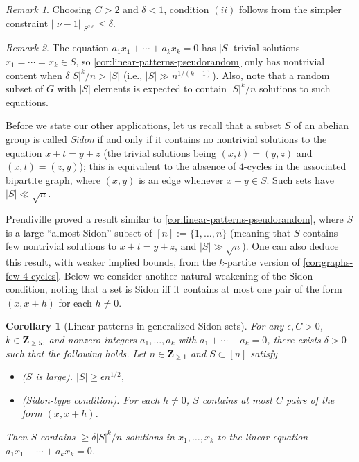 \documentclass[reqno,11pt]{amsart}
\newtheorem{corollary}[theorem]{Corollary}
\theoremstyle{definition}
\theoremstyle{remark}
\newtheorem*{remark}{Remark}
\numberwithin{equation}{section}
\newcommand{\Z}{\mathbf{Z}}
\begin{document}
\begin{remark}
Choosing $C > 2$ and $\delta < 1$, condition $(ii)$ follows from the simpler constraint $||\nu - 1||_{S^{2\ell}} \le \delta$.
\end{remark}

\begin{remark}
The equation $a_1 x_1 + \cdots + a_k x_k = 0$ has $|S|$ trivial solutions $x_1 = \cdots = x_k \in S$, so \cref{cor:linear-patterns-pseudorandom} only has nontrivial content when $\delta |S|^k / n > |S|$ (i.e., $|S| \gg n^{1/(k-1)}$). Also, note that a random subset of $G$ with $|S|$ elements is expected to contain $|S|^k/n$ solutions to such equations.
\end{remark}

Before we state our other applications, let us recall that a subset $S$ of an abelian group is called \emph{Sidon} if and only if it contains no nontrivial solutions to the equation $x + t = y + z$ (the trivial solutions being $(x, t) = (y, z)$ and $(x, t) = (z, y)$); this is equivalent to the absence of $4$-cycles in the associated bipartite graph, where $(x, y)$ is an edge whenever $x + y \in S$. Such sets have $|S| \ll \sqrt{n}$.

Prendiville \cite{prendiville2022solving} proved a result similar to \cref{cor:linear-patterns-pseudorandom}, where $S$ is a large ``almost-Sidon'' subset of $[n] := \{1, \ldots, n\}$ (meaning that $S$ contains few nontrivial solutions to $x + t = y + z$, and $|S| \gg \sqrt{n}$). One can also deduce this result, with weaker implied bounds, from the $k$-partite version of \cref{cor:graphs-few-4-cycles}. Below we consider another natural weakening of the Sidon condition, noting that a set is Sidon iff it contains at most one pair of the form $(x, x+h)$ for each $h \neq 0$.

\begin{corollary}[Linear patterns in generalized Sidon sets] \label{cor:linear-patterns-generalized-Sidon}
For any $\epsilon, C > 0$, $k \in \Z_{\ge 5}$, and nonzero integers $a_1, \ldots, a_k$ with $a_1 + \cdots + a_k = 0$, there exists $\delta > 0$ such that the following holds. Let $n \in \Z_{\ge 1}$ and $S \subset [n]$ satisfy
\begin{itemize}
    \item[$(i)$] \emph{($S$ is large).} $|S| \ge \epsilon n^{1/2}$,
    \item[$(ii)$] \emph{(Sidon-type condition).} For each $h \neq 0$, $S$ contains at most $C$ pairs of the form $(x, x+h)$.  
\end{itemize}
Then $S$ contains $\ge \delta |S|^k/n$ solutions in $x_1, \ldots, x_k$ to the linear equation $a_1 x_1 + \cdots + a_k x_k = 0$.
\end{corollary}
\end{document}
